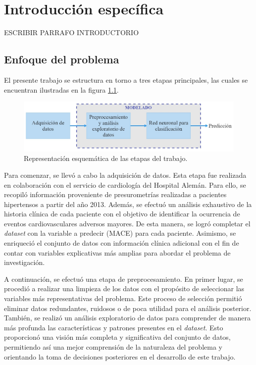 \chapter{Introducción específica} %

\label{Chapter2}

ESCRIBIR PARRAFO INTRODUCTORIO

\section{Enfoque del problema}
\label{sec:Enfoque del problema}

El presente trabajo se estructura en torno a tres etapas principales, las cuales se 
encuentran ilustradas en la figura \ref{fig:Etapas de trabajo}.


\begin{figure}[ht]
	\centering
	\includegraphics[width=\textwidth]{./Figures/Etapas de trabajo.jpg}
	\caption{Representación esquemática de las etapas del trabajo.}\label{fig:Etapas de trabajo}
\end{figure}

Para comenzar, se llevó a cabo la adquisición de datos. 
Esta etapa fue realizada en colaboración con el servicio de cardiología del Hospital Alemán. 
Para ello, se recopiló información proveniente de presurometrías realizadas a pacientes 
hipertensos a partir del año 2013. Además, se efectuó un análisis exhaustivo de la historia 
clínica de cada paciente con el objetivo de identificar la ocurrencia de eventos cardiovasculares 
adversos mayores. De esta manera, se logró completar el \textit{dataset} con la variable a predecir (MACE) 
para cada paciente. Asimismo, se enriqueció el conjunto de datos con información clínica adicional 
con el fin de contar con variables explicativas más amplias para abordar el problema de investigación.

A continuación, se efectuó una etapa de preprocesamiento. En primer lugar, se procedió a realizar 
una limpieza de los datos con el propósito de seleccionar las variables más representativas del 
problema. Este proceso de selección permitió eliminar datos redundantes, ruidosos o de poca 
utilidad para el análisis posterior. También, se realizó un análisis exploratorio de datos 
para comprender de manera más profunda las características y patrones presentes en el \textit{dataset}. 
Esto proporcionó una visión más completa y significativa del conjunto de datos, permitiendo 
así una mejor comprensión de la naturaleza del problema y orientando la toma de decisiones 
posteriores en el desarrollo de este trabajo.


